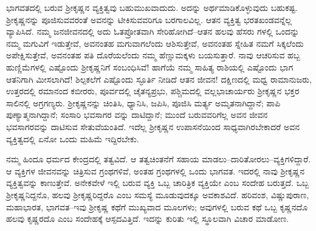 ಭಾಗವತದಲ್ಲಿ ಬರುವ ಶ್ರೀಕೃಷ್ಣನ ವ್ಯಕ್ತಿತ್ವವು ಬಹುಮುಖವಾದುದು. ಅದನ್ನು ಅರ್ಥಮಾಡಿಕೊಳ್ಳುವುದು ಬಹುಕಷ್ಟ. ಶ್ರೀಕೃಷ್ಣನನ್ನು ಪೂಜಿಸುವವರಂತೆ ಅವನನ್ನು ಟೀಕಿಸುವವರಿಗೂ ಬರಗಾಲವಿಲ್ಲ. ಆತನ ವ್ಯಕ್ತಿತ್ವ ಭರತಖಂಡವನ್ನೆಲ್ಲ ವ್ಯಾಪಿಸಿದೆ. ನಮ್ಮ ಜನಜೀವನದಲ್ಲಿ ಅದು ಓತಪ್ರೋತವಾಗಿ ಸೇರಿಹೋಗಿದೆ–ಆತನ ಹಲವು ಹೆಸರು ಗಳಲ್ಲಿ ಒಂದನ್ನು ನಮ್ಮ ಮಗುವಿಗೆ ಇಡುತ್ತೇವೆ, ಅವನಂತಹ ಮಗುವಾಗಲೆಂದು ಆಶಿಸುತ್ತೇವೆ, ಅವನಂತಹ ಸ್ನೇಹಿತ ನಮಗೆ ಸಿಕ್ಕಲೆಂದು ಅಪೇಕ್ಷಿಸುತ್ತೇವೆ, ಅವನಂತಹ ಪತಿ ದೊರೆಯಲೆಂದು ನಮ್ಮ ಹೆಣ್ಣುಮಕ್ಕಳು ಬಯಸುತ್ತಾರೆ. ನಾವು ಆಚರಿಸುವ ಹಬ್ಬ ಹುಣ್ಣಿಮೆಗಳಲ್ಲಿ ಎಷ್ಟೊಂದು ಶ್ರೀಕೃಷ್ಣನಿಗೆ ಸಂಬಂಧಿಸಿವೆ! ಹಾಗೆಯೆ ನಮ್ಮ ಸಾಹಿತ್ಯ ರಾಶಿಯಲ್ಲಿ ಎಷ್ಟೊಂದು ಭಾಗ ಆತನಿಗಾಗಿ ಮೀಸಲಾಗಿದೆ! ಶಿಲ್ಪಕಲೆಗೆ ಎಷ್ಟೊಂದು ಸ್ಫೂರ್ತಿ ನೀಡಿದೆ ಆತನ ಜೀವನ! ದಕ್ಷಿಣದಲ್ಲಿ ಮಧ್ವ ರಾಮಾನುಜರು, ಉತ್ತರದಲ್ಲಿ ರಮಾನಂದ ಕಬೀರರು, ಪೂರ್ವದಲ್ಲಿ ಚೈತನ್ಯಪ್ರಭು, ಪಶ್ಚಿಮದಲ್ಲಿ ವಲ್ಲಭಾಚಾರ್ಯರು ಶ್ರೀಕೃಷ್ಣನ ಭಕ್ತರ ಸಾಲಿನಲ್ಲಿ ಅಗ್ರಗಣ್ಯರು. ಶ್ರೀಕೃಷ್ಣನನ್ನು ಚಿಂತಿಸಿ, ಧ್ಯಾನಿಸಿ, ಜಪಿಸಿ, ಪೂಜಿಸಿ ಮರ್ತ್ಯ ಅಮೃತನಾಗಿದ್ದಾನೆ; ಪಾಪಿ ಪುಣ್ಯಾತ್ಮನಾಗಿದ್ದಾನೆ; ಸಂಸಾರಿ ಭವಸಾಗರ ವನ್ನು ದಾಟಿದ್ದಾನೆ; ಮುಂದೆ ಬರುವವರಿಗೆಲ್ಲ ಅವನ ಜೀವನ ಭವಸಾಗರವನ್ನು ದಾಟಿಸುವ ಸೇತುವೆಯಂತಿದೆ. ಇದೆಲ್ಲ ಶ್ರೀಕೃಷ್ಣನ ಉಪಾಸನೆಯಿಂದ ಸಾಧ್ಯವಾಗಿರಬೇಕಾದರೆ ಅವನ ವ್ಯಕ್ತಿತ್ವದಲ್ಲಿ ಏನೋ ಒಂದು ಮಹಿಮೆ ಇದ್ದಿರಬೇಕು.

ನಮ್ಮ ಹಿಂದೂ ಧರ್ಮದ ಕೇಂದ್ರದಲ್ಲಿ ತತ್ವವಿದೆ. ಆ ತತ್ವಚಿಂತನೆಗೆ ಸಹಾಯ ಮಾಡಲು–ದಾರಿತೋರಲು–ವ್ಯಕ್ತಿಗಳಿದ್ದಾರೆ. ಆ ವ್ಯಕ್ತಿಗಳ ಜೀವನವನ್ನು ಚಿತ್ರಿಸುವ ಗ್ರಂಥಗಳಿವೆ, ಅಂತಹ ಗ್ರಂಥಗಳಲ್ಲಿ ಒಂದು ಭಾಗವತ. ಇದರಲ್ಲಿ ನಾವು ಶ್ರೀಕೃಷ್ಣನ ವ್ಯಕ್ತಿತ್ವವನ್ನು ಕಾಣುತ್ತೇವೆ. ಅನೇಕವೇಳೆ ಇಲ್ಲಿ ಬರುವ ವ್ಯಕ್ತಿ ಒಬ್ಬ ಚಾರಿತ್ರಿಕ ವ್ಯಕ್ತಿಯೇ ಎಂಬ ಸಂದೇಹ ಬರುತ್ತದೆ. ಒಬ್ಬ ಶ್ರೀಕೃಷ್ಣನಿದ್ದನೊ, ಹಲವು ಶ್ರೀಕೃಷ್ಣರಿದ್ದರೊ ಎಂಬ ಸಮಸ್ಯೆ ಮೂಡುವುದಕ್ಕೂ ಅವಕಾಶವಿದೆ. ಹರಿವಂಶ, ವಿಷ್ಣುಪುರಾಣ, ಮಹಾಭಾರತ, ಭಾಗವತ–ಇವು ಶ್ರೀಕೃಷ್ಣ ಕಥೆಗೆ ಮುಖ್ಯವಾದ ಮೂಲಗಳು; ಅವುಗಳಲ್ಲಿ ಬರುವ ಕಥೆ ಒಬ್ಬ ಕೃಷ್ಣನದೊ ಹಲವು ಕೃಷ್ಣರದೊ ಎಂಬ ಸಂದೇಹಕ್ಕೆ ಆಸ್ಪದವಿತ್ತಿದೆ. ಇದನ್ನು ಕುರಿತು ಇಲ್ಲಿ ಸ್ಥೂಲವಾಗಿ ವಿಚಾರ ಮಾಡೋಣ.

